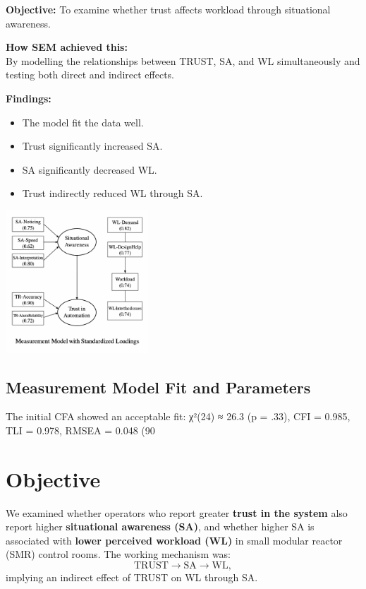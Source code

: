 \documentclass[conference]{IEEEtran}
\begin{document}
\textbf{Objective:} To examine whether trust affects workload through situational awareness.

\textbf{How SEM achieved this:} \\
By modelling the relationships between TRUST, SA, and WL simultaneously and testing both direct and indirect effects.

\textbf{Findings:}
\begin{itemize}
    \item The model fit the data well.
    \item Trust significantly increased SA.
    \item SA significantly decreased WL.
    \item Trust indirectly reduced WL through SA.
\end{itemize}

\includegraphics[width=0.4\textwidth]{measurement model with standardised loadings (1).png}

\subsection{Measurement Model Fit and Parameters}
The initial CFA showed an acceptable fit: χ²(24) ≈ 26.3 (p = .33), CFI = 0.985, TLI = 0.978, RMSEA = 0.048 (90%


\section{Objective}
We examined whether operators who report greater \textbf{trust in the system} also report higher \textbf{situational awareness (SA)}, and whether higher SA is associated with \textbf{lower perceived workload (WL)} in small modular reactor (SMR) control rooms. The working mechanism was:
\[
\text{TRUST} \rightarrow \text{SA} \rightarrow \text{WL},
\]
implying an indirect effect of TRUST on WL through SA.
\end{document}

